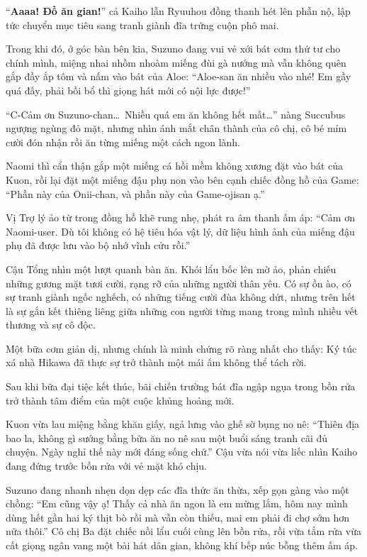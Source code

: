 ﻿\documentclass[../main.tex]{subfiles}
\begin{document}
``\textbf{Aaaa! Đồ ăn gian!}'' cả Kaiho lẫn Ryuuhou đồng thanh hét lên phẫn nộ, lập tức chuyển mục tiêu sang tranh giành đĩa trứng cuộn phô mai.

Trong khi đó, ở góc bàn bên kia, Suzuno đang vui vẻ xới bát cơm thứ tư cho chính mình, miệng nhai nhồm nhoàm miếng đùi gà nướng mà vẫn không quên gắp đầy ắp tôm và nấm vào bát của Aloe: ``Aloe-san ăn nhiều vào nhé! Em gầy quá đấy, phải bồi bổ thì giọng hát mới có nội lực được!''

``C-Cảm ơn Suzuno-chan\dots\ Nhiều quá em ăn không hết mất\dots'' nàng Succubus ngượng ngùng đỏ mặt, nhưng nhìn ánh mắt chân thành của cô chị, cô bé mỉm cười đón nhận rồi ăn từng miếng một cách ngon lành.

Naomi thì cẩn thận gắp một miếng cá hồi mềm không xương đặt vào bát của Kuon, rồi lại đặt một miếng đậu phụ non vào bên cạnh chiếc đồng hồ của Game: ``Phần này của Onii-chan, và phần này của Game-ojisan ạ.''

Vị Trợ lý ảo từ trong đồng hồ khẽ rung nhẹ, phát ra âm thanh ấm áp: ``Cảm ơn Naomi-user. Dù tôi không có hệ tiêu hóa vật lý, dữ liệu hình ảnh của miếng đậu phụ đã được lưu vào bộ nhớ vĩnh cửu rồi.''

Cậu Tổng nhìn một lượt quanh bàn ăn. Khói lẩu bốc lên mờ ảo, phản chiếu những gương mặt tươi cười, rạng rỡ của những người thân yêu. Có sự ồn ào, có sự tranh giành ngốc nghếch, có những tiếng cười đùa không dứt, nhưng trên hết là sự gắn kết thiêng liêng giữa những con người từng mang trong mình nhiều vết thương và sự cô độc.

Một bữa cơm giản dị, nhưng chính là minh chứng rõ ràng nhất cho thấy: Ký túc xá nhà Hikawa đã thực sự trở thành một mái ấm không thể tách rời.

\omk

Sau khi bữa đại tiệc kết thúc, bãi chiến trường bát đĩa ngập ngụa trong bồn rửa trở thành tâm điểm của một cuộc khủng hoảng mới.

Kuon vừa lau miệng bằng khăn giấy, ngả lưng vào ghế sờ bụng no nê: ``Thiên địa bao la, không gì sướng bằng bữa ăn no nê sau một buổi sáng tranh cãi đủ chuyện. Ngày nghỉ thế này mới đáng sống chứ.'' Cậu vừa nói vừa liếc nhìn Kaiho đang đứng trước bồn rửa với vẻ mặt khó chịu.

Suzuno đang nhanh nhẹn dọn dẹp các đĩa thức ăn thừa, xếp gọn gàng vào một chồng: ``Em cũng vậy ạ! Thấy cả nhà ăn ngon là em mừng lắm, hôm nay mình dùng hết gần hai ký thịt bò rồi mà vẫn còn thiếu, mai em phải đi chợ sớm hơn nữa thôi.'' Cô chị Ba đặt chiếc nồi lẩu cuối cùng lên bồn rửa, rồi vừa tắm rửa vừa cất giọng ngân vang một bài hát dân gian, không khí bếp núc bỗng thêm ấm áp.
\end{document}
